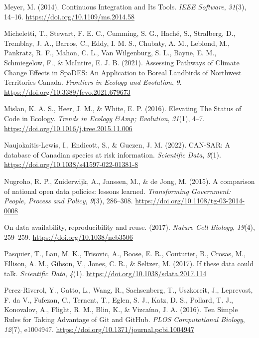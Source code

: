 \begin{CSLReferences}{1}{0}
\leavevmode{}%
Meyer, M. (2014). Continuous Integration and Its Tools. \emph{IEEE Software}, \emph{31}(3), 14--16. \url{https://doi.org/10.1109/ms.2014.58}

\leavevmode{}%
Micheletti, T., Stewart, F. E. C., Cumming, S. G., Haché, S., Stralberg, D., Tremblay, J. A., Barros, C., Eddy, I. M. S., Chubaty, A. M., Leblond, M., Pankratz, R. F., Mahon, C. L., Van Wilgenburg, S. L., Bayne, E. M., Schmiegelow, F., \& McIntire, E. J. B. (2021). Assessing Pathways of Climate Change Effects in SpaDES: An Application to Boreal Landbirds of Northwest Territories Canada. \emph{Frontiers in Ecology and Evolution}, \emph{9}. \url{https://doi.org/10.3389/fevo.2021.679673}

\leavevmode{}%
Mislan, K. A. S., Heer, J. M., \& White, E. P. (2016). Elevating The Status of Code in Ecology. \emph{Trends in Ecology \&Amp; Evolution}, \emph{31}(1), 4--7. \url{https://doi.org/10.1016/j.tree.2015.11.006}

\leavevmode{}%
Naujokaitis-Lewis, I., Endicott, S., \& Guezen, J. M. (2022). CAN-SAR: A database of Canadian species at risk information. \emph{Scientific Data}, \emph{9}(1). \url{https://doi.org/10.1038/s41597-022-01381-8}

\leavevmode{}%
Nugroho, R. P., Zuiderwijk, A., Janssen, M., \& de Jong, M. (2015). A comparison of national open data policies: lessons learned. \emph{Transforming Government: People, Process and Policy}, \emph{9}(3), 286--308. \url{https://doi.org/10.1108/tg-03-2014-0008}

\leavevmode{}%
On data availability, reproducibility and reuse. (2017). \emph{Nature Cell Biology}, \emph{19}(4), 259--259. \url{https://doi.org/10.1038/ncb3506}

\leavevmode{}%
Pasquier, T., Lau, M. K., Trisovic, A., Boose, E. R., Couturier, B., Crosas, M., Ellison, A. M., Gibson, V., Jones, C. R., \& Seltzer, M. (2017). If these data could talk. \emph{Scientific Data}, \emph{4}(1). \url{https://doi.org/10.1038/sdata.2017.114}

\leavevmode{}%
Perez-Riverol, Y., Gatto, L., Wang, R., Sachsenberg, T., Uszkoreit, J., Leprevost, F. da V., Fufezan, C., Ternent, T., Eglen, S. J., Katz, D. S., Pollard, T. J., Konovalov, A., Flight, R. M., Blin, K., \& Vizcaíno, J. A. (2016). Ten Simple Rules for Taking Advantage of Git and GitHub. \emph{PLOS Computational Biology}, \emph{12}(7), e1004947. \url{https://doi.org/10.1371/journal.pcbi.1004947}


\end{CSLReferences}
